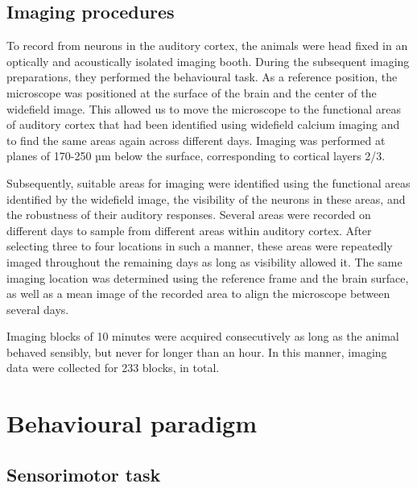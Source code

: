 \documentclass[]{report}
\theoremstyle{definition}
\theoremstyle{definition}
\theoremstyle{definition}
\theoremstyle{remark}
\begin{document}
\hypertarget{imaging-procedures}{%
\subsection{Imaging procedures}\label{imaging-procedures}}

To record from neurons in the auditory cortex, the animals were head
fixed in an optically and acoustically isolated imaging booth. During
the subsequent imaging preparations, they performed the behavioural
task. As a reference position, the microscope was positioned at the
surface of the brain and the center of the widefield image. This allowed
us to move the microscope to the functional areas of auditory cortex
that had been identified using widefield calcium imaging and to find the
same areas again across different days. Imaging was performed at planes
of 170-250 µm below the surface, corresponding to cortical layers 2/3.

Subsequently, suitable areas for imaging were identified using the
functional areas identified by the widefield image, the visibility of
the neurons in these areas, and the robustness of their auditory
responses. Several areas were recorded on different days to sample from
different areas within auditory cortex. After selecting three to four
locations in such a manner, these areas were repeatedly imaged
throughout the remaining days as long as visibility allowed it. The same
imaging location was determined using the reference frame and the brain
surface, as well as a mean image of the recorded area to align the
microscope between several days.

Imaging blocks of 10 minutes were acquired consecutively as long as the
animal behaved sensibly, but never for longer than an hour. In this
manner, imaging data were collected for 233 blocks, in total.

\hypertarget{behavioural-paradigm}{%
\section{Behavioural paradigm}\label{behavioural-paradigm}}

\hypertarget{sensorimotor-task}{%
\subsection{Sensorimotor task}\label{sensorimotor-task}}
\end{document}
